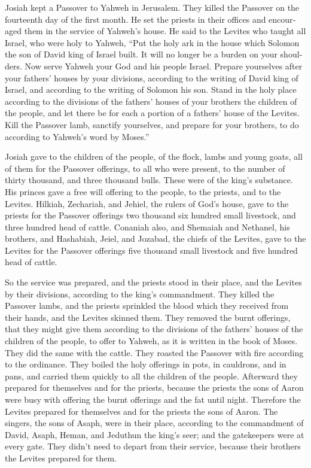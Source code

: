 \begin{paracol}{2}
\begin{otherlanguage}{english}
 Josiah kept a Passover to Yahweh in Jerusalem. They
killed the Passover on the fourteenth day of the first month.
 He set the priests in their offices and encouraged them
in the service of Yahweh's house.  He said to the Levites
who taught all Israel, who were holy to Yahweh, ``Put the holy ark in
the house which Solomon the son of David king of Israel built. It will
no longer be a burden on your shoulders. Now serve Yahweh your God and
his people Israel.  Prepare yourselves after your fathers'
houses by your divisions, according to the writing of David king of
Israel, and according to the writing of Solomon his son. 
Stand in the holy place according to the divisions of the fathers'
houses of your brothers the children of the people, and let there be for
each a portion of a fathers' house of the Levites.  Kill
the Passover lamb, sanctify yourselves, and prepare for your brothers,
to do according to Yahweh's word by Moses.''

 Josiah gave to the children of the people, of the flock,
lambs and young goats, all of them for the Passover offerings, to all
who were present, to the number of thirty thousand, and three thousand
bulls. These were of the king's substance.  His princes
gave a free will offering to the people, to the priests, and to the
Levites. Hilkiah, Zechariah, and Jehiel, the rulers of God's house, gave
to the priests for the Passover offerings two thousand six hundred small
livestock, and three hundred head of cattle.  Conaniah
also, and Shemaiah and Nethanel, his brothers, and Hashabiah, Jeiel, and
Jozabad, the chiefs of the Levites, gave to the Levites for the Passover
offerings five thousand small livestock and five hundred head of cattle.

 So the service was prepared, and the priests stood in
their place, and the Levites by their divisions, according to the king's
commandment.  They killed the Passover lambs, and the
priests sprinkled the blood which they received from their hands, and
the Levites skinned them.  They removed the burnt
offerings, that they might give them according to the divisions of the
fathers' houses of the children of the people, to offer to Yahweh, as it
is written in the book of Moses. They did the same with the cattle.
 They roasted the Passover with fire according to the
ordinance. They boiled the holy offerings in pots, in cauldrons, and in
pans, and carried them quickly to all the children of the people.
 Afterward they prepared for themselves and for the
priests, because the priests the sons of Aaron were busy with offering
the burnt offerings and the fat until night. Therefore the Levites
prepared for themselves and for the priests the sons of Aaron.
 The singers, the sons of Asaph, were in their place,
according to the commandment of David, Asaph, Heman, and Jeduthun the
king's seer; and the gatekeepers were at every gate. They didn't need to
depart from their service, because their brothers the Levites prepared
for them.


\end{otherlanguage}
\end{paracol}
